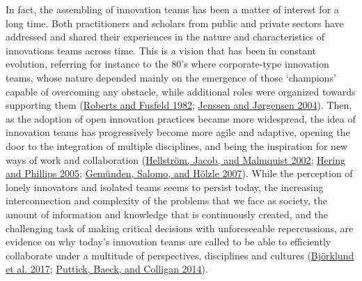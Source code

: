 \documentclass[AMA,STIX1COL,APA,STIX2COL]{WileyNJD-v2}
\begin{document}
In fact, the assembling of innovation teams has been a matter of
interest for a long time. Both practitioners and scholars from public
and private sectors have addressed and shared their experiences in the
nature and characteristics of innovations teams across time. This is a
vision that has been in constant evolution, referring for instance to
the 80's where corporate-type innovation teams, whose nature depended
mainly on the emergence of those `champions' capable of overcoming any
obstacle, while additional roles were organized towards supporting them
(\protect\hyperlink{ref-Roberts1982}{Roberts and Fusfeld 1982};
\protect\hyperlink{ref-Jenssen2004}{Jenssen and Jørgensen 2004}). Then,
as the adoption of open innovation practices became more widespread, the
idea of innovation teams has progressively become more agile and
adaptive, opening the door to the integration of multiple disciplines,
and being the inspiration for new ways of work and collaboration
(\protect\hyperlink{ref-Hellstrom2002}{Hellström, Jacob, and Malmquist
2002}; \protect\hyperlink{ref-Hering2005}{Hering and Phillips 2005};
\protect\hyperlink{ref-Gemunden2007}{Gemünden, Salomo, and Hölzle
2007}). While the perception of lonely innovators and isolated teams
seems to persist today, the increasing interconnection and complexity of
the problems that we face as society, the amount of information and
knowledge that is continuously created, and the challenging task of
making critical decisions with unforeseeable repercussions, are evidence
on why today's innovation teams are called to be able to efficiently
collaborate under a multitude of perspectives, disciplines and cultures
(\protect\hyperlink{ref-Bjorklund2017}{Björklund et al. 2017};
\protect\hyperlink{ref-Puttick2014-Teams}{Puttick, Baeck, and Colligan
2014}).
\end{document}
